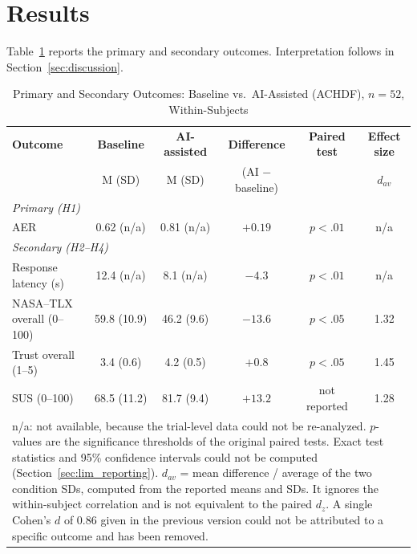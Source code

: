 \documentclass[journal]{IEEEtran}
\theoremstyle{plain}
\theoremstyle{definition}
\begin{document}
    \section{Results}
    Table~\ref{tab:primary} reports the primary and secondary outcomes. Interpretation follows in Section~\ref{sec:discussion}.

    \begin{table}[t]
        \caption{Primary and Secondary Outcomes: Baseline vs.\ AI-Assisted (ACHDF), $n=52$, Within-Subjects}
        \label{tab:primary}
        \centering
        \begin{tabular}{l c c c c c}
            \toprule
            \textbf{Outcome} & \textbf{Baseline} & \textbf{AI-assisted} & \textbf{Difference} & \textbf{Paired test} & \textbf{Effect size} \\
            & M (SD) & M (SD) & (AI $-$ baseline) & & $d_{av}$ \\
            \midrule
            \multicolumn{6}{l}{\emph{Primary (H1)}} \\
            AER & 0.62 (n/a) & 0.81 (n/a) & $+0.19$ & $p < .01$ & n/a \\
            \midrule
            \multicolumn{6}{l}{\emph{Secondary (H2--H4)}} \\
            Response latency (s) & 12.4 (n/a) & 8.1 (n/a) & $-4.3$ & $p < .01$ & n/a \\
            NASA--TLX overall (0--100) & 59.8 (10.9) & 46.2 (9.6) & $-13.6$ & $p < .05$ & 1.32 \\
            Trust overall (1--5) & 3.4 (0.6) & 4.2 (0.5) & $+0.8$ & $p < .05$ & 1.45 \\
            SUS (0--100) & 68.5 (11.2) & 81.7 (9.4) & $+13.2$ & not reported & 1.28 \\
            \bottomrule
            \multicolumn{6}{p{0.92\linewidth}}{\footnotesize n/a: not available, because the trial-level data could not be re-analyzed. $p$-values are the significance thresholds of the original paired tests. Exact test statistics and 95\% confidence intervals could not be computed (Section~\ref{sec:lim_reporting}). $d_{av}$ = mean difference / average of the two condition SDs, computed from the reported means and SDs. It ignores the within-subject correlation and is not equivalent to the paired $d_z$. A single Cohen's $d$ of 0.86 given in the previous version could not be attributed to a specific outcome and has been removed.}
        \end{tabular}
    \end{table}
\end{document}
